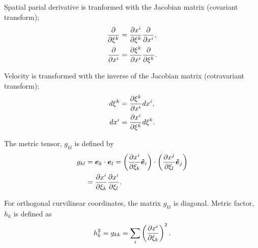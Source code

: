 Spatial parial derivative is tranformed with the Jacobian matrix (covariant transform);
\begin{align}
  \pd{}{\xi^k} &= \pd{x^i}{\xi^k}\pd{}{x^i}, \\
  \pd{}{x^i} &= \pd{\xi^k}{x^i}\pd{}{\xi^k}.
\end{align}


Velocity is transformed with the inverse of the Jacobian matrix (cotravariant transform);
\begin{align}
  d\xi^k &= \pd{\xi^k}{x^i} dx^i, \\
  dx^i &= \pd{x^i}{\xi^k} d\xi^k.
\end{align}



The metric tensor, $g_{kl}$ is defined by
\begin{align}
  g_{kl} &= \bm{e}_k \cdot \bm{e}_l
  = \left(\pd{x^i}{\xi_k}\bm{\hat{e}}_i\right) \cdot \left(\pd{x^j}{\xi_l}\bm{\hat{e}}_j\right) \nonumber\\
  &= \pd{x^i}{\xi_k}\pd{x^i}{\xi_l}.
\end{align}

For orthogonal curvilinear coordinates, the matrix ${g_{kl}}$ is diagonal.
Metric factor, $h_k$ is defined as
\begin{equation}
  h_k^2 = g_{kk} = \sum_i \left(\pd{x^i}{\xi_k}\right)^2.
\end{equation}

